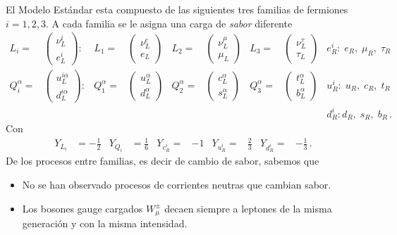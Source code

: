 \begin{frame}
El Modelo Estándar esta compuesto de las siguientes tres familias de fermiones $i=1,2,3$. A cada familia se le asigna una carga de \emph{sabor} diferente
\begin{align}
L_i=&
\begin{pmatrix}
  \nu^i_L\\
  e^i_L
\end{pmatrix}:&
  L_1=&
  \begin{pmatrix}
    \nu^e_L\\
    e_L
  \end{pmatrix}&  L_2=&
  \begin{pmatrix}
    \nu^\mu_L\\
    \mu_L
  \end{pmatrix}&  L_3=&
  \begin{pmatrix}
    \nu^\tau_L\\
    \tau_L
  \end{pmatrix}& e_R^i:\;e_R,\;\mu_R,\;\tau_R\nonumber\\
Q_i^\alpha=&
\begin{pmatrix}
  u^{i\alpha}_L\\
  d^{i\alpha}_L
\end{pmatrix}:&
  Q_1^\alpha=&
  \begin{pmatrix}
    u^\alpha_L\\
    d^\alpha_L
  \end{pmatrix}&  Q_2^\alpha=&
  \begin{pmatrix}
    c^\alpha_L\\
    s^\alpha_L
  \end{pmatrix}&  Q_3^\alpha=&
  \begin{pmatrix}
    t^\alpha_L\\
    b^\alpha_L
  \end{pmatrix}& u_R^i:\;u_R,\;c_R,\;t_R\nonumber\\
&&&&&&&&d_R^i:d_R,\;s_R,\;b_R\,.
\end{align}
Con
\begin{align}
  Y_{L_i}&=-\frac{1}{2}&Y_{Q_i}&=\frac{1}{6}& Y_{e_R^i}=&-1&
Y_{u_R^i}=&\frac{2}{3}&Y_{d_R^i}=&-\frac{1}{3}\,.
\end{align}
De los procesos entre familias, es decir de cambio de sabor, sabemos que
\begin{itemize} %
\item No se han observado procesos de corrientes neutras que cambian sabor.
\item Los bosones gauge cargados $W_\mu^\pm$ decaen siempre a leptones de la misma generación y con la misma intensidad.
\end{itemize} %


\end{frame}
